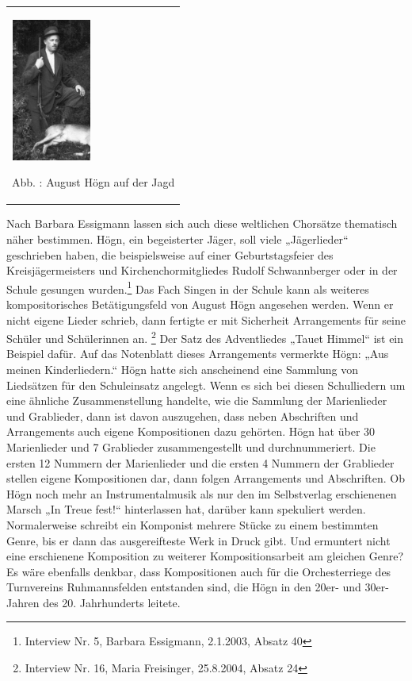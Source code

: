 \begin{flushleft}
\tablefirsthead{}
\tablehead{}
\tabletail{}
\tablelasttail{}
\begin{supertabular}{m{2.809cm}}

\begin{center}

\includegraphics[width=2.626cm,height=4.68cm]{pictures/zulassungsarbeit-img068.jpg}

\end{center}
Abb. : August Högn auf der Jagd\\
\end{supertabular}
\end{flushleft}
Nach Barbara Essigmann lassen sich auch diese weltlichen Chorsätze
thematisch näher bestimmen. Högn, ein begeisterter Jäger, soll viele
„Jägerlieder“ geschrieben haben, die beispielsweise auf einer
Geburtstagsfeier des Kreisjägermeisters und Kirchenchormitgliedes
Rudolf Schwannberger oder in der Schule gesungen wurden.\footnote{
Interview Nr. 5, Barbara Essigmann, 2.1.2003, Absatz 40} Das Fach
Singen in der Schule kann als weiteres kompositorisches Betätigungsfeld
von August Högn angesehen werden. Wenn er nicht eigene Lieder schrieb,
dann fertigte er mit Sicherheit Arrangements für seine Schüler und
Schülerinnen an. \footnote{Interview Nr. 16, Maria Freisinger,
25.8.2004, Absatz 24} Der Satz des Adventliedes „Tauet Himmel“ ist ein
Beispiel dafür. Auf das Notenblatt dieses Arrangements vermerkte Högn:
„Aus meinen Kinderliedern.“ Högn hatte sich anscheinend eine Sammlung
von Liedsätzen für den Schuleinsatz angelegt. Wenn es sich bei diesen
Schulliedern um eine ähnliche Zusammenstellung handelte, wie die
Sammlung der Marienlieder und Grablieder, dann ist davon auszugehen,
dass neben Abschriften und Arrangements auch eigene Kompositionen dazu
gehörten. Högn hat über 30 Marienlieder und 7 Grablieder
zusammengestellt und durchnummeriert. Die ersten 12 Nummern der
Marienlieder und die ersten 4 Nummern der Grablieder stellen eigene
Kompositionen dar, dann folgen Arrangements und Abschriften. Ob Högn
noch mehr an Instrumentalmusik als nur den im Selbstverlag erschienenen
Marsch „In Treue fest!“ hinterlassen hat, darüber kann spekuliert
werden. Normalerweise schreibt ein Komponist mehrere Stücke zu einem
bestimmten Genre, bis er dann das ausgereifteste Werk in Druck gibt.
Und ermuntert nicht eine erschienene Komposition zu weiterer
Kompositionsarbeit am gleichen Genre? Es wäre ebenfalls denkbar, dass
Kompositionen auch für die Orchesterriege des Turnvereins
Ruhmannsfelden entstanden sind, die Högn in den 20er- und 30er-Jahren
des 20. Jahrhunderts leitete.
